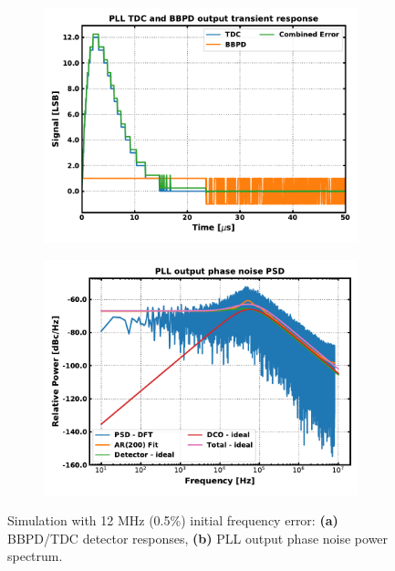 	\begin{figure}[htb!]
	    \centering
	    \begin{subfigure}{0.5\textwidth}
	        \centering
	        \center\includegraphics[width=1.0\textwidth, angle=0]{figs/trans_tdc_bbpd.pdf}
	        \caption{ }
	        \label{fig:trans_det}
	    \end{subfigure}%
	    \begin{subfigure}{0.5\textwidth}
	        \centering
	        \center\includegraphics[width=1.0\textwidth, angle=0]{figs/trans_phase_noise.pdf}
	        \caption{ }
	        \label{fig:trans_phase_noise}
	    \end{subfigure}
	    \label{fig:trans_sim2}
	    \caption{Simulation with 12 MHz (0.5\%) initial frequency error: \textbf{(a)} BBPD/TDC detector responses, \textbf{(b)} PLL output phase noise power spectrum.}
	\end{figure}


